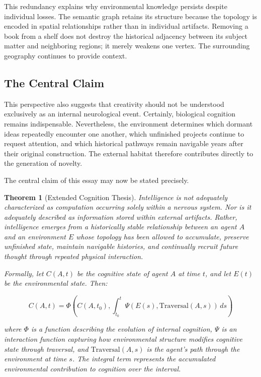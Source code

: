 \documentclass[12pt,oneside]{article}
\newtheorem{theorem}[definition]{Theorem}
\theoremstyle{remark}
\begin{document}
This redundancy explains why environmental knowledge persists despite individual losses. The semantic graph retains its structure because the topology is encoded in spatial relationships rather than in individual artifacts. Removing a book from a shelf does not destroy the historical adjacency between its subject matter and neighboring regions; it merely weakens one vertex. The surrounding geography continues to provide context.

\subsection{The Central Claim}

This perspective also suggests that creativity should not be understood exclusively as an internal neurological event. Certainly, biological cognition remains indispensable. Nevertheless, the environment determines which dormant ideas repeatedly encounter one another, which unfinished projects continue to request attention, and which historical pathways remain navigable years after their original construction. The external habitat therefore contributes directly to the generation of novelty.

The central claim of this essay may now be stated precisely.

\begin{theorem}[Extended Cognition Thesis]
Intelligence is not adequately characterized as computation occurring solely within a nervous system. Nor is it adequately described as information stored within external artifacts. Rather, intelligence emerges from a historically stable relationship between an agent $A$ and an environment $E$ whose topology has been allowed to accumulate, preserve unfinished state, maintain navigable histories, and continually recruit future thought through repeated physical interaction.

Formally, let $C(A, t)$ be the cognitive state of agent $A$ at time $t$, and let $E(t)$ be the environmental state. Then:

\begin{equation}
C(A, t) = \Phi\left(C(A, t_0), \int_{t_0}^{t} \Psi(E(s), \text{Traversal}(A, s)) \, ds\right)
\end{equation}

where $\Phi$ is a function describing the evolution of internal cognition, $\Psi$ is an interaction function capturing how environmental structure modifies cognitive state through traversal, and $\text{Traversal}(A, s)$ is the agent's path through the environment at time $s$. The integral term represents the accumulated environmental contribution to cognition over the interval.
\end{theorem}
\end{document}
